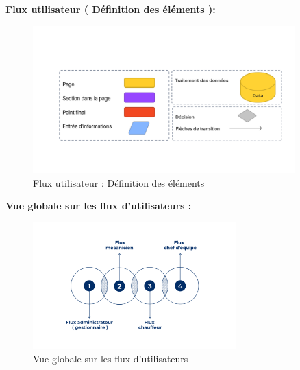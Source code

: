 \textbf{Flux utilisateur ( Définition des éléments ):} 
\begin{figure}[htbp]
  \centering
  \includegraphics[width=0.9\textwidth]{chap2.images/user flow ( Définition des éléments ).png}
  \caption{Flux utilisateur : Définition des éléments} 
\end{figure}

\newpage

\textbf{Vue globale sur les flux d’utilisateurs :} 
\begin{figure}[htbp]
  \centering
  \includegraphics[width=0.7\textwidth]{chap2.images/vue global user flow.png}
  \caption{Vue globale sur les flux d'utilisateurs}
\end{figure}





